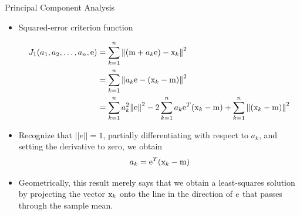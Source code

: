 \begin{frame}{Principal Component Analysis}
\begin{itemize}
\item Squared-error criterion function
\begin{footnotesize}
\begin{align}
{J_1}({a_1},{a_2}, \ldots ,{a_n},{\rm e}) &= \sum\limits_{k = 1}^n {{{\left\| {({\rm m} + {a_k}{\rm e}) - {{\rm x}_k}} \right\|}^2}}\nonumber\\
&  = \sum\limits_{k = 1}^n {{{\left\| {{a_k}{\rm e} - ({{\rm x}_k} - {\rm m})} \right\|}^2}} \nonumber\\
& = \sum\limits_{k = 1}^n {a_k^2{{\left\| {\rm e} \right\|}^2} - 2} \sum\limits_{k = 1}^n {{a_k}{{\rm e}^T}({{\rm x}_k} - {\rm m})}  + \sum\limits_{k = 1}^n {{{\left\| {({{\rm x}_k} - {\rm m})} \right\|}^2}} \nonumber
\end{align}
\end{footnotesize}
\item Recognize that $||e||=1$, partially differentiating with respect to $a_k$, and setting the derivative to zero, we obtain
\begin{equation}
a_k={\rm e}^T({\rm x}_k-{\rm m}) \nonumber
\end{equation}
\item Geometrically, this result merely says that we obtain a least-squares solution by projecting the vector ${\rm x}_k$ onto the line in the direction of ${\rm e}$ that passes through the sample mean.
\end{itemize}
\end{frame}

